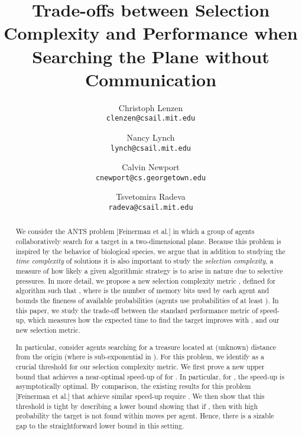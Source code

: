 \documentclass[11pt]{article}
\begin{document}
\title{Trade-offs between Selection Complexity and Performance when Searching the Plane without Communication}
\date{}
\author{
  Christoph Lenzen\\
  \texttt{clenzen@csail.mit.edu}
  \and
  Nancy Lynch\\
  \texttt{lynch@csail.mit.edu}
  \and
  Calvin Newport\\
  \texttt{cnewport@cs.georgetown.edu}
  \and
  Tsvetomira Radeva\\
  \texttt{radeva@csail.mit.edu}
}
\maketitle

\begin{abstract}
We consider the ANTS problem [Feinerman et al.] in which a group of agents collaboratively search for a target in a two-dimensional plane. Because this problem is inspired by the behavior of biological species, we argue that in addition to studying the {\em time complexity} of solutions it is also important to study the {\em selection complexity}, a measure of how likely a given algorithmic strategy is to arise in nature due to selective pressures. In more detail, we propose a new selection complexity metric , defined for algorithm  such that , where  is the number of memory bits used by each agent and  bounds the fineness of available probabilities (agents use probabilities of at least ). In this paper, we study the trade-off between the standard performance metric of speed-up, which measures how the expected time to find the target improves with , and our new selection metric. 

In particular, consider  agents searching for a treasure located at (unknown) distance  from the origin (where  is sub-exponential in ). For this problem, we identify  as a crucial threshold for our selection complexity metric. We first prove a new upper bound that achieves a near-optimal speed-up of  for . In particular, for , the speed-up is asymptotically optimal. By comparison, the existing results for this problem [Feinerman et al.] that achieve similar speed-up require . We then show that this threshold is tight by describing a lower bound showing that if , then with high probability the target is not found within  moves per agent. Hence, there is a sizable gap to the straightforward  lower bound in this setting. 


\end{abstract}


\thispagestyle{empty}
\setcounter{page}{0}
\end{document}
